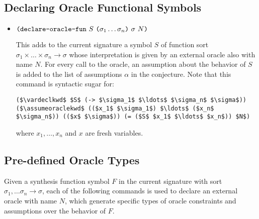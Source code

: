 \documentclass[english,a4paper,10pt]{article}
\begin{document}
\subsection{Declaring Oracle Functional Symbols}

\begin{itemize}
\item $\texttt{(}\texttt{declare-oracle-fun}\mbox{ }S\mbox{ } \texttt{(}\sigma_1 \ldots \sigma_n\texttt{)}\mbox{ }\sigma \mbox{ } N\texttt{)}$

This adds to the current signature a symbol $S$ of function sort 
$\sigma_1 \times \ldots \times \sigma_n \rightarrow \sigma$
whose interpretation is given by an external oracle also with name $N$. 
For every call to the oracle, an assumption about the behavior of $S$ is added to the list of assumptions $\alpha$ in the conjecture.
Note that this command is syntactic sugar for:

\begin{lstlisting}[language=SyGuS-Desugar]
($\vardeclkwd$ $S$ (-> $\sigma_1$ $\ldots$ $\sigma_n$ $\sigma$))
($\assumeoraclekwd$ (($x_1$ $\sigma_1$) $\ldots$ ($x_n$ $\sigma_n$)) (($x$ $\sigma$)) (= ($S$ $x_1$ $\ldots$ $x_n$)) $N$)
\end{lstlisting}

where $x_1, \ldots, x_n$ and $x$ are fresh variables.
\end{itemize}


\subsection{Pre-defined Oracle Types}
Given a synthesis function symbol $F$ in the current signature
with sort $\sigma_1, \ldots \sigma_n \rightarrow \sigma$, each of the following commands 
is used to declare an external oracle with name $N$, which generate specific types of oracle constraints and assumptions over the behavior of $F$. 
\end{document}

